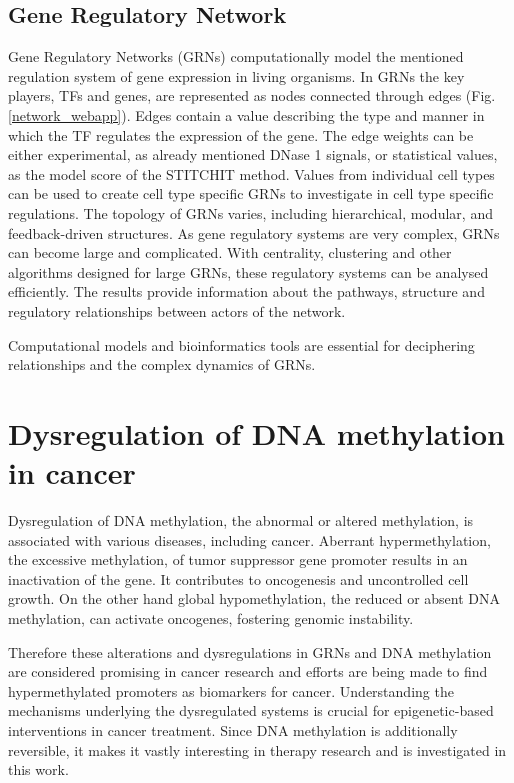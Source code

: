 \documentclass[pdftex,12pt,a4paper]{report}
\begin{document}
\subsection{Gene Regulatory Network}
Gene Regulatory Networks (GRNs) computationally model the mentioned regulation system of gene expression in living organisms\cite{GRN2}. 	
In GRNs the key players, TFs and genes, are represented as nodes connected through edges (Fig. \ref{network_webapp}). Edges contain a value describing the type and manner in which the TF regulates the expression of the gene. The edge weights can be either experimental, as already mentioned DNase 1 signals, or statistical values, as the model score of the STITCHIT method. Values from individual cell types can be used to create cell type specific GRNs to investigate in cell type specific regulations. 
The topology of GRNs varies, including hierarchical, modular, and feedback-driven structures. As gene regulatory systems are very complex, GRNs can become large and complicated. With centrality, clustering and other algorithms designed for large GRNs, these regulatory systems can be analysed efficiently. The results provide information about the pathways, structure and regulatory relationships between actors of the network\cite{GRN3}. 

Computational models and bioinformatics tools are essential for deciphering relationships and the complex dynamics of GRNs. 

\section{Dysregulation of DNA methylation in cancer}
Dysregulation of DNA methylation, the abnormal or altered methylation, is associated with various diseases, including cancer. Aberrant hypermethylation, the excessive methylation, of tumor suppressor gene promoter results in an inactivation of the gene. It contributes to oncogenesis and uncontrolled cell growth. On the other hand global hypomethylation, the reduced or absent DNA methylation, can activate oncogenes, fostering genomic instability\cite{MethCancer}.

Therefore these alterations and dysregulations in GRNs and DNA methylation are considered promising in cancer research and efforts are being made to find hypermethylated promoters as biomarkers for cancer. Understanding the mechanisms underlying the dysregulated systems is crucial for epigenetic-based interventions in cancer treatment. Since DNA methylation is additionally reversible, it makes it vastly interesting in therapy research and is investigated in this work\cite{MethRole}.
\end{document}
